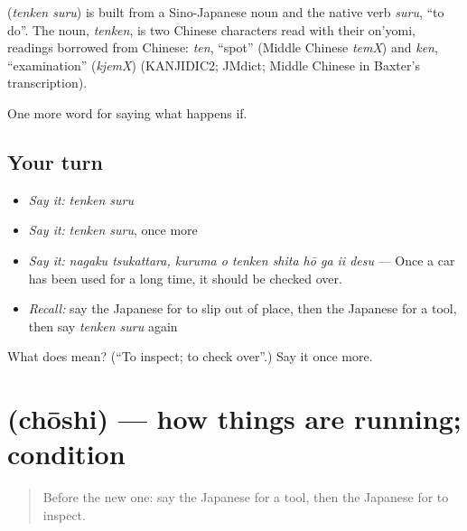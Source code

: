 \begin{cousinweb}
\textbf{} (\emph{tenken suru}) is built from a Sino-Japanese noun and the native verb \emph{suru}, \textquotedblleft{}to do\textquotedblright{}. The noun, \emph{tenken}, is two Chinese characters read with their on'yomi, readings borrowed from Chinese: \emph{ten}, \textquotedblleft{}spot\textquotedblright{} (Middle Chinese \emph{temX}) and \emph{ken}, \textquotedblleft{}examination\textquotedblright{} (\emph{kjemX}) (KANJIDIC2; JMdict; Middle Chinese in Baxter's transcription).
\end{cousinweb}

\begin{grammarlens}[title={What you've built}]
One more word for saying what happens if.
\end{grammarlens}

\subsection*{Your turn}
\begin{itemize}
\raggedright
  \item \emph{Say it:} \emph{tenken suru}
  \item \emph{Say it:} \emph{tenken suru}, once more
  \item \emph{Say it:} \emph{nagaku tsukattara, kuruma o tenken shita hō ga ii desu} — Once a car has been used for a long time, it should be checked over.
  \item \emph{Recall:} say the Japanese for to slip out of place, then the Japanese for a tool, then say \emph{tenken suru} again
\end{itemize}

\begin{tcolorbox}[breakable,colback=teal!4,colframe=teal!35!black,title={Before you move on}]
What does  mean? (\textquotedblleft{}To inspect; to check over\textquotedblright{}.) Say it once more.
\end{tcolorbox}
\section[\texorpdfstring{\ja{ちょうし} (chōshi)}{ちょうし (chōshi)}]{ (chōshi) — how things are running; condition}

\label{lesson:JA-C353-choushi}



\begin{quote}
Before the new one: say the Japanese for a tool, then the Japanese for to inspect.
\end{quote}

